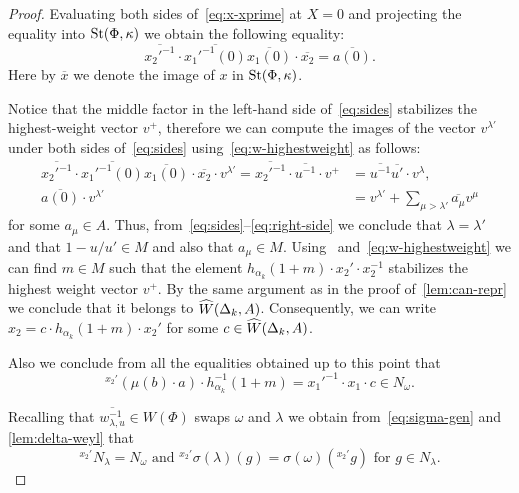 \begin{cor}
\begin{proof}
 Evaluating both sides of~\eqref{eq:x-xprime} at $X=0$ and projecting the equality into $\operatorname{St}(\Phi, \kappa)$ we obtain the following equality:
 \begin{equation} \label{eq:sides}
 \overline{{x_2'}^{-1}} \cdot \overline{{x_1'}^{-1}(0)} \overline{x_1(0)} \cdot \overline{x_2} = \overline{a(0)}.
 \end{equation}
 Here by $\overline{x}$ we denote the image of $x$ in $\operatorname{St}(\Phi, \kappa)$.

 Notice that the middle factor in the left-hand side of~\eqref{eq:sides} stabilizes the highest-weight vector $v^+$,
 therefore we can compute the images of the vector $v^{\lambda'}$ under both sides of~\eqref{eq:sides} using~\eqref{eq:w-highestweight} as follows:
 \begin{align} \overline{{x_2'}^{-1}} \cdot \overline{{x_1'}^{-1}(0)} \overline{x_1(0)} \cdot \overline{x_2} \cdot v^{\lambda'} = \overline{{x_2'}^{-1}} \cdot \overline{{u}^{-1}} \cdot v^+ &= \overline{u^{-1}}\overline{u'} \cdot v^\lambda, \\
               \overline{a(0)} \cdot v^{\lambda'} &= v^{\lambda'} + \sum_{\mu > \lambda'} \overline{a_\mu} v^\mu \label{eq:right-side} \end{align}
 for some $a_\mu \in A$.
 Thus, from~\eqref{eq:sides}--\eqref{eq:right-side} we conclude that $\lambda = \lambda'$ and that $1 - u/u' \in M$ and also that $a_\mu \in M$.
 Using~\cite[Lemma~7]{V00} and~\eqref{eq:w-highestweight} we can find $m \in M$ such that the element
  $h_{\alpha_k}(1+m) \cdot x_2' \cdot x_2^{-1}$ stabilizes the highest weight vector $v^+$.
 By the same argument as in the proof of~\cref{lem:can-repr} we conclude that it belongs to $\widehat{W}(\Delta_k, A)$.
 Consequently, we can write $x_2 = c \cdot h_{\alpha_k}(1+m) \cdot x_2'$ for some $c \in \widehat{W}(\Delta_k, A)$.

 Also we conclude from all the equalities obtained up to this point that
 \begin{equation} {}^{x_2'}(\mu(b) \cdot a) \cdot h_{\alpha_k}^{-1}(1+m) = {x_1'}^{-1} \cdot x_1 \cdot c \in N_\omega. \end{equation}

 Recalling that $\overline{w_{\lambda, u}^{-1}} \in W(\Phi)$ swaps $\omega$ and $\lambda$
  we obtain from~\eqref{eq:sigma-gen} and \cref{lem:delta-weyl} that
 \begin{equation} \label{eq:delta-weyl-x2prime} {}^{x_2'}N_\lambda = N_\omega\text{ and } {}^{x_2'}\sigma(\lambda)(g) = \sigma(\omega)({}^{x_2'}g)\text{ for } g\in N_\lambda.\end{equation}


\end{proof}
\end{cor}
